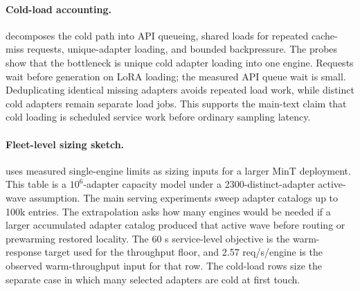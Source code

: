 \begin{table}[H]
\centering
\scriptsize
\setlength{\tabcolsep}{3.4pt}
\renewcommand{\arraystretch}{1.08}
\caption{Capacity-planning sketch from measured per-engine limits to a 1M-entry accumulated adapter catalog and a 2300-distinct-adapter active-wave stress envelope.}
\label{tab:app_fleet_model}
\end{table}

\paragraph{Cold-load accounting.}
 decomposes the cold path into API queueing, shared loads for repeated cache-miss requests, unique-adapter loading, and bounded backpressure. The probes show that the bottleneck is unique cold adapter loading into one engine. Requests wait before generation on LoRA loading; the measured API queue wait is small. Deduplicating identical missing adapters avoids repeated load work, while distinct cold adapters remain separate load jobs. This supports the main-text claim that cold loading is scheduled service work before ordinary sampling latency.

\paragraph{Fleet-level sizing sketch.}
 uses measured single-engine limits as sizing inputs for a larger MinT deployment. This table is a $10^6$-adapter capacity model under a 2300-distinct-adapter active-wave assumption. The main serving experiments sweep adapter catalogs up to 100k entries. The extrapolation asks how many engines would be needed if a larger accumulated adapter catalog produced that active wave before routing or prewarming restored locality. The 60 s service-level objective is the warm-response target used for the throughput floor, and 2.57 req/s/engine is the observed warm-throughput input for that row. The cold-load rows size the separate case in which many selected adapters are cold at first touch.
